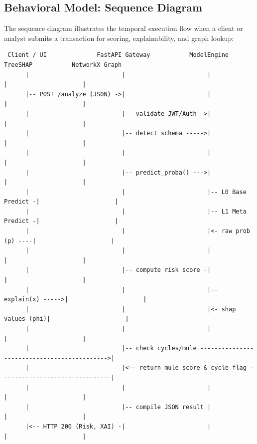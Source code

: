 \documentclass[12pt,a4paper,oneside]{report}
\begin{document}
\subsection{Behavioral Model: Sequence Diagram}

The sequence diagram illustrates the temporal execution flow when a client or analyst submits a transaction for scoring, explainability, and graph lookup:


\begin{lstlisting}
 Client / UI              FastAPI Gateway           ModelEngine           TreeSHAP           NetworkX Graph
      |                          |                       |                    |                     |
      |-- POST /analyze (JSON) ->|                       |                    |                     |
      |                          |-- validate JWT/Auth ->|                    |                     |
      |                          |-- detect schema ----->|                    |                     |
      |                          |                       |                    |                     |
      |                          |-- predict_proba() --->|                    |                     |
      |                          |                       |-- L0 Base Predict -|                     |
      |                          |                       |-- L1 Meta Predict -|                     |
      |                          |                       |<- raw prob (p) ----|                     |
      |                          |                       |                    |                     |
      |                          |-- compute risk score -|                    |                     |
      |                          |                       |-- explain(x) ----->|                     |
      |                          |                       |<- shap values (phi)|                     |
      |                          |                       |                    |                     |
      |                          |-- check cycles/mule -------------------------------------------->|
      |                          |<-- return mule score & cycle flag -------------------------------|
      |                          |                       |                    |                     |
      |                          |-- compile JSON result |                    |                     |
      |<-- HTTP 200 (Risk, XAI) -|                       |                    |                     |
\end{lstlisting}
\end{document}
